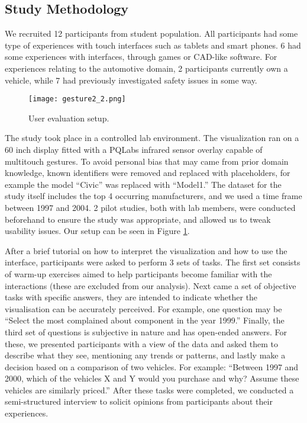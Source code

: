\subsection{Study Methodology}
We recruited 12 participants from student population. All participants had some
type of experiences with touch interfaces such as tablets and smart phones. 6
had some experiences with \threed interfaces, through games or CAD-like
software. For experiences relating to the automotive domain, 2 participants
currently own a vehicle, while 7 had previously investigated safety issues in
some way. 
 
	\begin{figure}
	 \centering  
	 \texttt{[image: gesture2\_2.png]}  
	 \caption{User evaluation setup.}
	 \label{figure:study}
	\end{figure}


The study took place in a controlled lab environment. The visualization ran on
a 60 inch display fitted with a PQLabs infrared sensor overlay capable of
multitouch gestures. To avoid personal bias that may came from prior domain
knowledge, known identifiers were removed and replaced with placeholders,
for example the model ``Civic'' was replaced with ``Model1.'' The dataset for
the study itself includes the top 4 occurring manufacturers, and we used a time
frame between 1997 and 2004. 2 pilot studies, both with lab members, were
conducted beforehand to ensure the study was appropriate, and allowed us to
tweak usability issues. Our setup can be seen in Figure \ref{figure:study}.


After a brief tutorial on how to interpret the visualization and how to use the
interface, participants were asked to perform 3 sets of tasks. The first set
consists of warm-up exercises aimed to help participants become familiar with the 
interactions (these are excluded from our analysis). Next came a set of
objective tasks with specific answers, they are intended to indicate whether the
\threed visualisation can be accurately perceived. For example, one question may
be ``Select the most complained about component in the year 1999.'' Finally,
the third set of questions is subjective in nature and has open-ended answers.
For these, we presented participants with a view of the data and asked them to
describe what they see, mentioning any trends or patterns, and lastly make a
decision based on a comparison of two vehicles. For example: ``Between 1997 and
2000, which of the vehicles X and Y would you purchase and why? Assume these vehicles are
similarly priced.'' After these tasks were completed, we conducted a
semi-structured interview to solicit opinions from participants about their
experiences.  

